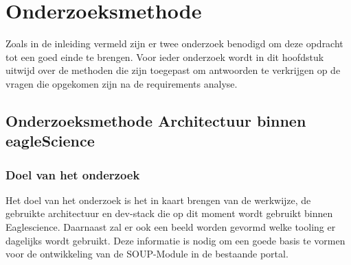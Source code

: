 
\chapter{Onderzoeksmethode} %

\label{OnderzoeksMethode} %
Zoals in de inleiding vermeld zijn er twee onderzoek benodigd om deze opdracht tot een goed einde te brengen. Voor ieder onderzoek wordt in dit hoofdstuk uitwijd over de methoden die zijn toegepast om antwoorden te verkrijgen op de vragen die opgekomen zijn na de requirements analyse.
\section{Onderzoeksmethode Architectuur binnen eagleScience}
\subsection{Doel van het onderzoek}
Het doel van het onderzoek is het in kaart brengen van de werkwijze, de gebruikte architectuur en dev-stack die op dit moment wordt gebruikt binnen Eaglescience. Daarnaast zal er ook een beeld worden gevormd welke tooling er dagelijks wordt gebruikt. Deze informatie is nodig om een goede basis te vormen voor de ontwikkeling van de SOUP-Module in de bestaande portal.

